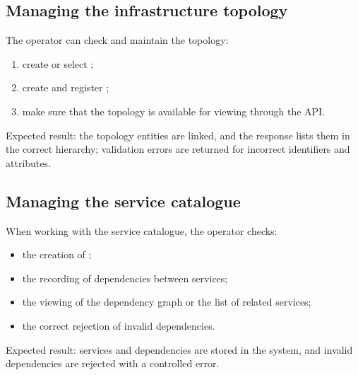 \documentclass[12pt,a4paper]{extarticle}
\begin{document}
\subsection{Managing the infrastructure topology}

\begin{hseExample}
The operator can check and maintain the topology:

\begin{enumerate}[label=\arabic*), leftmargin=1.25cm]
    \item create or select ;
    \item create  and register ;
    \item make sure that the topology is available for viewing through the API.
\end{enumerate}

Expected result: the topology entities are linked, and the response lists them in the correct hierarchy; validation errors are returned for incorrect identifiers and attributes.
\end{hseExample}

\subsection{Managing the service catalogue}

\begin{hseExample}
When working with the service catalogue, the operator checks:

\begin{itemize}[leftmargin=1.25cm]
    \item the creation of ;
    \item the recording of dependencies between services;
    \item the viewing of the dependency graph or the list of related services;
    \item the correct rejection of invalid dependencies.
\end{itemize}

Expected result: services and dependencies are stored in the system, and invalid dependencies are rejected with a controlled error.
\end{hseExample}
\end{document}
